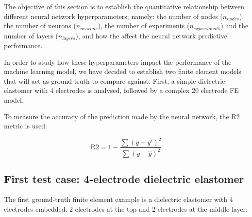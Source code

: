 The objective of this section is to establish the quantitative relationship between different neural network hyperparameters; namely: the number of nodes ($n_{nodes}$), the number of neurons ($n_{neurons}$), the number of experiments ($n_{experiments}$) and the number of layers ($n_{layers}$), and how the affect the neural network predictive performance. 

In order to study how these hyperparameters impact the performance of the machine learning model, we have decided to establish two finite element models that will act as ground-truth to compare against. First, a simple dielectric elastomer with 4 electrodes is analysed, followed by a complex 20 electrode FE model. 

To measure the accuracy of the prediction made by the neural network, the R2 metric is used. 

\begin{equation}
  \mbox{R2} = 1 - \dfrac{\sum ( y - y')^2}{\sum (y - \hat{y})^2}
  \label{eq:R2_measurement}
\end{equation}

\subsection{First test case: 4-electrode dielectric elastomer}


The first ground-truth finite element example is a dielectric elastomer with 4 electrodes embedded: 2 electrodes at the top and 2 electrodes at the middle layer:

